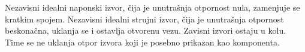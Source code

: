 Nezavisni idealni naponski izvor, čija je unutrašnja otpornost nula, zamenjuje se kratkim spojem. Nezavisni idealni strujni izvor, čija je unutrašnja otpornost beskonačna, uklanja se i ostavlja otvorenu vezu. Zavisni izvori ostaju u kolu. Time se ne uklanja otpor izvora koji je posebno prikazan kao komponenta.
